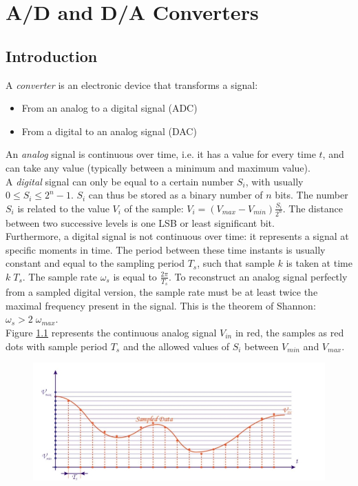 \chapter{A/D and D/A Converters}
\section{Introduction}

A \emph{converter} is an electronic device that transforms a signal:
\begin{itemize}
	\item From an analog to a digital signal (ADC)
	\item From a digital to an analog signal (DAC)
\end{itemize}
An \emph{analog} signal is continuous over time, i.e. it has a value for every time $t$, and can take any value (typically between a minimum and maximum value).\\
A \emph{digital} signal can only be equal to a certain number $S_i$, with usually $0 \le S_i \le 2^n - 1$. $S_i$ can thus be stored as a binary number of $n$ bits. The number $S_i$ is related to the value $V_i$ of the sample: $V_i = (V_{max} - V_{min}) \frac{S_i}{2^n}$. The distance between two successive levels is one LSB or least significant bit.\\
Furthermore, a digital signal is not continuous over time: it represents a signal at specific moments in time. The period between these time instants is usually constant and equal to the sampling period $T_s$, such that sample $k$ is taken at time $k\; T_s$. The sample rate $\omega_s$ is equal to $\frac{2 \pi}{T_s}$. To reconstruct an analog signal perfectly from a sampled digital version, the sample rate must be at least twice the maximal frequency present in the signal. This is the theorem of Shannon: $\omega_s > 2 \; \omega_{max}$.\\
Figure \ref{fig:intro1} represents the continuous analog signal $V_{in}$ in red, the samples as red dots with sample period $T_s$ and the allowed values of $S_i$ between $V_{min}$ and $V_{max}$.\\
\begin{figure}[h!]
	\centering
	\includegraphics[width=14cm]{figures/ch18/intro1.jpg}
	\caption{}
	\label{fig:intro1}
\end{figure}
